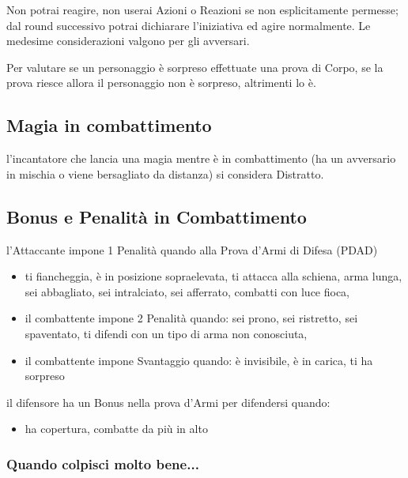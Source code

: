 \documentclass[12pt,a4paper,twoside,openany]{book}
\begin{document}
\begin{multicols}{2}
Non potrai reagire, non userai Azioni o Reazioni se non esplicitamente permesse; dal round successivo potrai dichiarare l'iniziativa ed agire normalmente. Le medesime considerazioni valgono per gli avversari.

Per valutare se un personaggio è sorpreso effettuate una prova di Corpo, se la prova riesce allora il personaggio non è sorpreso, altrimenti lo è.

\subsection{Magia in combattimento}\label{magiaincombattimento}

l'incantatore che lancia una magia mentre è in combattimento (ha un avversario in mischia o viene bersagliato da distanza) si considera Distratto.

\subsection{Bonus e Penalità in Combattimento}

l'Attaccante impone 1 Penalità quando alla Prova d'Armi di Difesa (PDAD)

\begin{itemize}

\item ti fiancheggia, è in posizione sopraelevata, ti attacca alla schiena, arma lunga, sei abbagliato, sei intralciato, sei afferrato, combatti con luce fioca, 

\item 
il combattente impone 2 Penalità quando:
\subitem sei prono, sei ristretto, sei spaventato, ti difendi con un tipo di arma non conosciuta, 

\item 
il combattente impone Svantaggio quando:
\subitem è invisibile, è in carica, ti ha sorpreso

\end{itemize}

il difensore ha un Bonus nella prova d'Armi per difendersi quando:

\begin{itemize}
	
\item 
ha copertura, combatte da più in alto

\end{itemize}

\subsubsection{Quando colpisci molto bene...}


\end{multicols}
\end{document}
